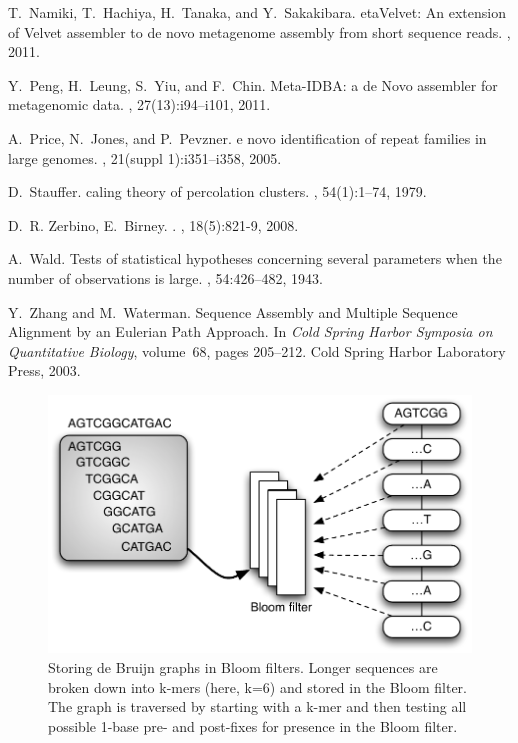 \documentclass{pnastwo}
\begin{document}
\begin{article}
\begin{thebibliography}{10}
T.~Namiki, T.~Hachiya, H.~Tanaka, and Y.~Sakakibara.
eta{V}elvet: {A}n extension of {V}elvet assembler to de novo
  metagenome assembly from short sequence reads.
, 2011.

Y.~Peng, H.~Leung, S.~Yiu, and F.~Chin.
\newblock Meta-IDBA: a de Novo assembler for metagenomic data.
, 27(13):i94--i101, 2011.

A.~Price, N.~Jones, and P.~Pevzner.
e novo identification of repeat families in large genomes.
, 21(suppl 1):i351--i358, 2005.

D.~Stauffer.
caling theory of percolation clusters.
, 54(1):1--74, 1979.

D.~R. Zerbino, E.~Birney.
.
, 18(5):821-9, 2008.

A.~Wald.
\newblock Tests of statistical hypotheses concerning several parameters when
  the number of observations is large.
, 54:426--482,
  1943.

Y.~Zhang and M.~Waterman.
 {S}equence {A}ssembly and {M}ultiple {S}equence {A}lignment
  by an {E}ulerian {P}ath {A}pproach.
\newblock In {\em Cold Spring Harbor Symposia on Quantitative Biology},
  volume~68, pages 205--212. Cold Spring Harbor Laboratory Press, 2003.

\end{thebibliography}

\end{article}

\begin{figure}
\centering
\includegraphics[width=5in]{bloomgraph}
\caption{Storing de Bruijn graphs in Bloom filters.  Longer sequences are broken down into k-mers (here, k=6) and stored in the Bloom filter.
The graph is traversed by starting with a k-mer and then testing all possible 1-base pre- and post-fixes for presence in the Bloom filter.}

\label{fig:bloomgraph}
\end{figure}
\end{document}
